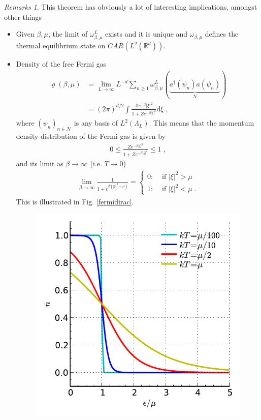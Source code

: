 \documentclass[
a4paper, %
11pt, %
onecolumn, %
openany, %
]{memoir}
\theoremstyle{definition}
\theoremstyle{remark}
\newtheorem{remarks}{Remarks}[chapter]
\theoremstyle{plain}
\begin{document}
\begin{remarks} This theorem has obviously a lot of interesting implications, amongst other things
	\begin{itemize}
		 \item Given $\beta,\mu$, the limit of $\omega_{\beta,\mu}^L$ exists and it is unique and $\omega_{\beta,\mu}$ defines the thermal equilibrium state on $CAR(L^2(\mathbb{R}^d))$.
		 \item Density of the free Fermi gas \begin{align}
		 \varrho(\beta,\mu)&=\lim_{L\rightarrow\infty}L^{-d}\sum_{n\geq 1} \omega_{\beta,\mu}^L(\underbrace{a^{\dagger}(\psi_n)a(\psi_n)}_{\mathcal{N}})\\
		 &=(2\pi)^{d/2}\int \frac{Ze^{-\beta}|\xi|^2}{1+Ze^{-\beta|\xi|^2}}\mathrm{d}\xi\; ,
		 \end{align}
		 where $(\psi_n)_{n\in\mathcal{N}}$ is any basis of $L^2(\Lambda_L)$. This means that the momentum density distribution of the Fermi-gas is given by\begin{align}
		 0\leq \frac{Ze^{-\beta|\xi|^2}}{1+Ze^{-\beta|\xi|^2}}\leq 1\; ,
		 \end{align}
		 and its limit as $\beta\rightarrow\infty$ (i.e. $T\rightarrow 0$) \begin{align}
		 \lim_{\beta\rightarrow \infty}\frac{1}{1+e^{\beta(|\xi|^2-\mu)}}=\begin{cases}
		 0 :& \text{ if }|\xi|^2 > \mu\\
		 1 :& \text{ if }|\xi|^2< \mu \; .
		 \end{cases}\label{eqn::limit_of_fermi_density}
		 \end{align}
		 This is illustrated in Fig. \ref{fermidirac}. \begin{figure}\centering
		 	\includegraphics[scale=1]{fermidirac.pdf}

\end{figure}
\end{itemize}
\end{remarks}
\end{document}
